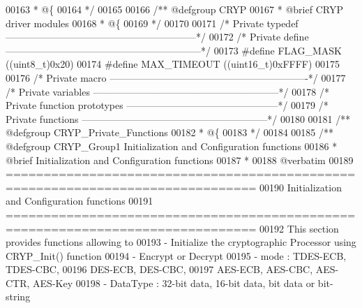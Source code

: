 \begin{DoxyCode}
00163 \textcolor{comment}{  * @\{}
00164 \textcolor{comment}{  */}
00165 
00166 \textcolor{comment}{/** @defgroup CRYP }
00167 \textcolor{comment}{  * @brief CRYP driver modules}
00168 \textcolor{comment}{  * @\{}
00169 \textcolor{comment}{  */}
00170 
00171 \textcolor{comment}{/* Private typedef -----------------------------------------------------------*/}
00172 \textcolor{comment}{/* Private define ------------------------------------------------------------*/}
00173 \textcolor{preprocessor}{#}\textcolor{preprocessor}{define} \textcolor{preprocessor}{FLAG\_MASK}     \textcolor{preprocessor}{(}\textcolor{preprocessor}{(}\textcolor{preprocessor}{uint8\_t}\textcolor{preprocessor}{)}0x20\textcolor{preprocessor}{)}
00174 \textcolor{preprocessor}{#}\textcolor{preprocessor}{define} \textcolor{preprocessor}{MAX\_TIMEOUT}   \textcolor{preprocessor}{(}\textcolor{preprocessor}{(}\textcolor{preprocessor}{uint16\_t}\textcolor{preprocessor}{)}0xFFFF\textcolor{preprocessor}{)}
00175 
00176 \textcolor{comment}{/* Private macro -------------------------------------------------------------*/}
00177 \textcolor{comment}{/* Private variables ---------------------------------------------------------*/}
00178 \textcolor{comment}{/* Private function prototypes -----------------------------------------------*/}
00179 \textcolor{comment}{/* Private functions ---------------------------------------------------------*/}
00180 
00181 \textcolor{comment}{/** @defgroup CRYP\_Private\_Functions}
00182 \textcolor{comment}{  * @\{}
00183 \textcolor{comment}{  */}
00184 
00185 \textcolor{comment}{/** @defgroup CRYP\_Group1 Initialization and Configuration functions}
00186 \textcolor{comment}{ *  @brief    Initialization and Configuration functions }
00187 \textcolor{comment}{ *}
00188 \textcolor{comment}{@verbatim    }
00189 \textcolor{comment}{ ===============================================================================}
00190 \textcolor{comment}{                      Initialization and Configuration functions}
00191 \textcolor{comment}{ ===============================================================================  }
00192 \textcolor{comment}{  This section provides functions allowing to }
00193 \textcolor{comment}{   - Initialize the cryptographic Processor using CRYP\_Init() function }
00194 \textcolor{comment}{      -  Encrypt or Decrypt }
00195 \textcolor{comment}{      -  mode : TDES-ECB, TDES-CBC, }
00196 \textcolor{comment}{                DES-ECB, DES-CBC, }
00197 \textcolor{comment}{                AES-ECB, AES-CBC, AES-CTR, AES-Key }
00198 \textcolor{comment}{      - DataType :  32-bit data, 16-bit data, bit data or bit-string}

\end{DoxyCode}
